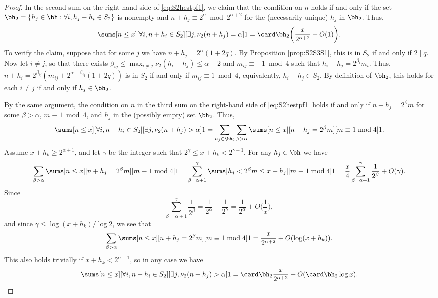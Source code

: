 \documentclass[12pt, reqno, twoside, letterpaper]{amsart}
\begin{document}
\begin{nix}
\begin{proof}
In the second sum on the right-hand side of \eqref{eq:S2hestpf1}, 
we claim that the condition on $n$ holds if and only if the set 
$
 \bh_2 = \{h_j \in \bh : \forall i, h_j - h_i \in S_2\} 
$
is nonempty and 
$n + h_j \equiv 2^{\alpha} \bmod 2^{\alpha + 2}$ for the 
(necessarily unique) $h_j$ in $\bh_2$.
%
Thus,  
\begin{equation}
 \label{eq:S2hestpf3}
 \sums[n \le x][\forall i, n + h_i \in S_2][\exists j, \nu_2(n + h_j) = \alpha] 1
  =
   \card\bh_2
    \bigg(\frac{x}{2^{\alpha + 2}} + O(1)\bigg).
\end{equation}
%
To verify the claim, suppose that for some $j$ we have 
$n + h_j = 2^{\alpha}(1 + 2q)$.
%
By Proposition \ref{prop:S2S3S1}, this is in $S_2$ if and only if 
$2 \mid q$.
%
Now let $i \ne j$, so that there exists 
$\beta_{ij} \le \max_{i \ne j} \nu_2(h_i - h_j) \le \alpha - 2$ 
and $m_{ij} \equiv \pm 1 \bmod 4$ such that 
$h_i - h_j = 2^{\beta_i}m_i$.
%
Thus, 
$
 n + h_i 
  = 2^{\beta_{ij}}
   (m_{ij} + 2^{\alpha - \beta_{ij}}(1 + 2q)) 
$ 
is in $S_2$ if and only if $m_{ij} \equiv 1 \bmod 4$, 
equivalently, $h_i - h_j \in S_2$.
%
By definition of $\bh_2$, this holds for each $i \ne j$ if and 
only if $h_j \in \bh_2$.

By the same argument, the condition on $n$ in the third sum on the 
right-hand side of \eqref{eq:S2hestpf1} holds if and only if 
$n + h_j = 2^{\beta}m$ for some $\beta > \alpha$, 
$m \equiv 1 \bmod 4$, and $h_j$ in the (possibly empty) set 
$\bh_2$.
%
Thus,  
\[
 \sums[n \le x][\forall i, n + h_i \in S_2][\exists j, \nu_2(n + h_j) > \alpha] 1 
  =
   \sum_{h_j \in \bh_2}
    \sum_{\beta > \alpha}
     \sums[n \le x][n + h_j = 2^{\beta}m][m \equiv 1 \bmod 4] 1.
\] 
%
Assume $x + h_k \ge 2^{\alpha + 1}$, and let $\gamma$ be the 
integer such that $2^{\gamma} \le x + h_k < 2^{\gamma + 1}$.
%
For any $h_j \in \bh$ we have 
\[
 \sum_{\beta > \alpha}
  \sums[n \le x][n + h_j = 2^{\beta}m][m \equiv 1 \bmod 4] 1
   =
    \sum_{\beta = \alpha + 1}^{\gamma}
     \sums[h_j < 2^{\beta}m \le x + h_j][m \equiv 1 \bmod 4] 1
      =
      \frac{x}{4}
       \sum_{\beta = \alpha + 1}^{\gamma}
        \frac{1}{2^{\beta}} 
         + 
          O(\gamma).
\]
%
Since
\[
 \sum_{\beta = \alpha + 1}^{\gamma}
  \frac{1}{2^{\beta}}
   =
    \frac{1}{2^{\alpha}}
     -
      \frac{1}{2^{\gamma}}
      =
       \frac{1}{2^{\alpha}} + O\bigg(\frac{1}{x}\bigg), 
\]
and since $\gamma \le \log(x + h_k)/\log 2$, we see that 
\[
 \sum_{\beta > \alpha}
  \sums[n \le x][n + h_j = 2^{\beta}m][m \equiv 1 \bmod 4] 1 
   =
    \frac{x}{2^{\alpha + 2}} + O(\log(x + h_k)).
\]
%
This also holds trivially if $x + h_k < 2^{\alpha + 1}$, so in 
any case we have 
\begin{equation}
 \label{eq:S2hestpf4}
 \sums[n \le x][\forall i, n + h_i \in S_2][\exists j, \nu_2(n + h_j) > \alpha] 1 
  =
   \card\bh_2\frac{x}{2^{\alpha + 2}} + O(\card\bh_2\log x).
\end{equation}


\end{proof}
\end{nix}
\end{document}
